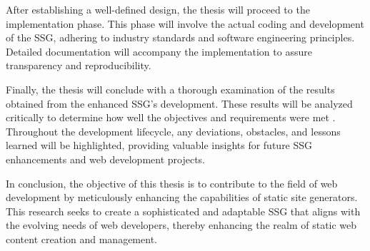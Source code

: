 After establishing a well-defined design, the thesis will proceed to the implementation phase. This phase will
involve the actual coding and development of the SSG, adhering to industry standards and software engineering
principles. Detailed documentation will accompany the implementation to assure transparency and reproducibility.

Finally, the thesis will conclude with a thorough examination of the results obtained from the enhanced SSG's
development. These results will be analyzed critically to determine how well the objectives and requirements were met
. Throughout the development lifecycle, any deviations, obstacles, and lessons learned will be highlighted, providing
valuable insights for future SSG enhancements and web development projects.

In conclusion, the objective of this thesis is to contribute to the field of web development by meticulously
enhancing the capabilities of static site generators. This research seeks to create a sophisticated and adaptable SSG
that aligns with the evolving needs of web developers, thereby enhancing the realm of static web content creation and
management.


